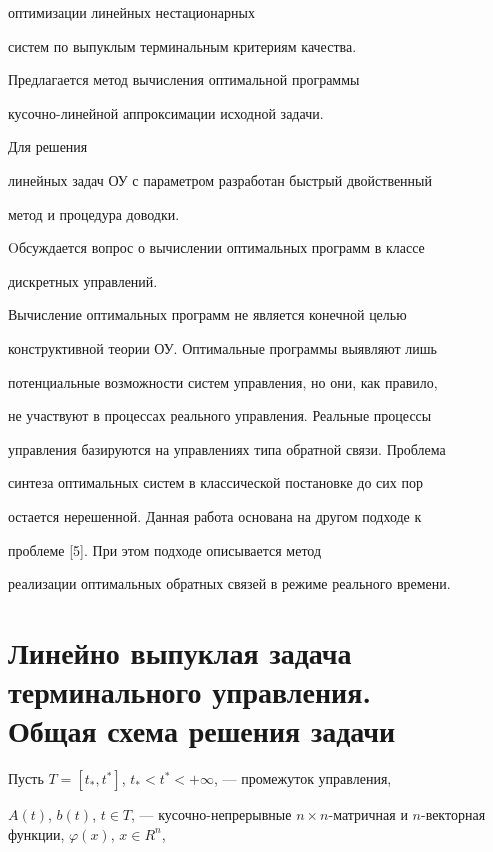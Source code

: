 оптимизации линейных нестационарных


систем по выпуклым терминальным критериям качества.





Предлагается метод вычисления оптимальной программы


кусочно-линейной аппроксимации исходной задачи.


Для решения


линейных задач ОУ с параметром разработан быстрый двойственный


метод и процедура доводки.


Oбсуждается вопрос о вычислении оптимальных программ в классе


дискретных управлений.


Вычисление оптимальных программ не является конечной целью


конструктивной теории ОУ. Оптимальные программы выявляют лишь


потенциальные возможности систем управления, но они, как правило,


не участвуют в процессах реального управления. Реальные процессы


управления базируются на управлениях типа обратной связи. Проблема


синтеза оптимальных систем в классической постановке до сих пор


остается нерешенной. Данная работа основана на другом подходе к


проблеме [5]. При этом подходе описывается метод


реализации оптимальных обратных связей в режиме реального времени.








\section{Линейно выпуклая задача терминального управления.\protect\\


Общая схема решения задачи}





Пусть $T=[t_*,t^*]$, $t_*<t^*<+\infty$, --- промежуток управления,


$A(t)$, $b(t)$, $t\in T$, --- кусочно-непрерывные $n\times


n$-матричная и $n$-векторная функции, $\varphi(x)$, $x\in R^n$,


